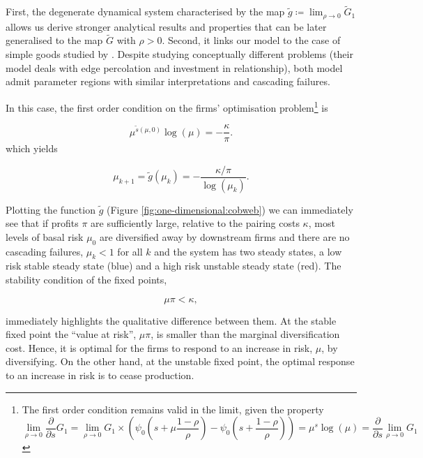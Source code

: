 \documentclass[../../main.tex]{subfiles}
\begin{document}
First, the degenerate dynamical system characterised by the map $\tilde{g} \coloneqq \lim_{\rho \to 0} \tilde{G}_1$ allows us derive stronger analytical results and properties that can be later generalised to the map $\tilde{G}$ with $\rho > 0$. Second, it links our model to the case of simple goods studied by . Despite studying conceptually different problems (their model deals with edge percolation and investment in relationship), both model admit parameter regions with similar interpretations and cascading failures.

In this case, the first order condition on the firms' optimisation problem\footnote{
  The first order condition remains valid in the limit, given the property
  \begin{equation}
    \lim_{\rho \rightarrow 0} \frac{\partial}{\partial s}G_1 = \lim_{\rho \rightarrow 0} G_1 \times \left(\psi_0\left(s + \mu \frac{1 - \rho}{\rho} \right) - \psi_0\left(s + \frac{1 - \rho}{\rho} \right) \right) = \mu^{s} \log(\mu) = \frac{\partial}{\partial s} \lim_{\rho \rightarrow 0} G_1
  \end{equation}
} is

\begin{equation} \label{eq:one-dimension:foc}
  \mu^{\tilde{s}(\mu, 0)} \log(\mu) = -\frac{\kappa}{\pi}.
\end{equation} which yields

\begin{equation}
  \mu_{k+1} = \tilde{g}(\mu_k) = -\frac{\kappa / \pi}{\log(\mu_k)}.
\end{equation}

Plotting the function $\tilde{g}$ (Figure \ref{fig:one-dimensional:cobweb}) we can immediately see that if profits $\pi$ are sufficiently large, relative to the pairing costs $\kappa$, most levels of basal risk $\mu_0$ are diversified away by downstream firms and there are no cascading failures, $\mu_k < 1$ for all $k$ and the system has two steady states, a low risk stable steady state (blue) and a high risk unstable steady state (red). The stability condition of the fixed points,

\begin{equation}
  \mu \pi < \kappa,
\end{equation}

immediately highlights the qualitative difference between them. At the stable fixed point the ``value at risk'', $\mu \pi$, is smaller than the marginal diversification cost. Hence, it is optimal for the firms to respond to an increase in risk, $\mu$, by diversifying. On the other hand, at the unstable fixed point, the optimal response to an increase in risk is to cease production.
\end{document}

